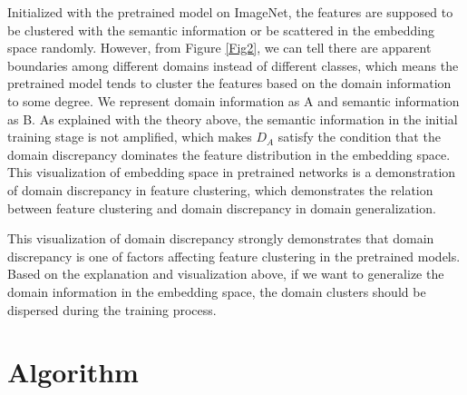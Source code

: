 \documentclass[a4paper,fleqn]{cas-dc}
\begin{document}
 Initialized with the pretrained model on ImageNet, the features are supposed to be clustered with the semantic information or be scattered in the embedding space randomly. However, from Figure \ref{Fig2}, we can tell there are apparent boundaries among different domains instead of different classes, which means the pretrained model tends to cluster the features based on the domain information to some degree. We represent domain information as A and semantic information as B. As explained with the theory above, the semantic information in the initial training stage is not amplified, which makes $D_{A}$ satisfy the condition that the domain discrepancy dominates the feature distribution in the embedding space. This visualization of embedding space in pretrained networks is a demonstration of domain discrepancy in feature clustering, which demonstrates the relation between feature clustering and domain discrepancy in domain generalization. 
 
This visualization of domain discrepancy strongly demonstrates that domain discrepancy is one of factors affecting feature clustering in the pretrained models. Based on the explanation and visualization above, if we want to generalize the domain information in the embedding space, the domain clusters should be dispersed during the training process.
 \section{Algorithm}
\label{sec: Algorithm}
\end{document}
